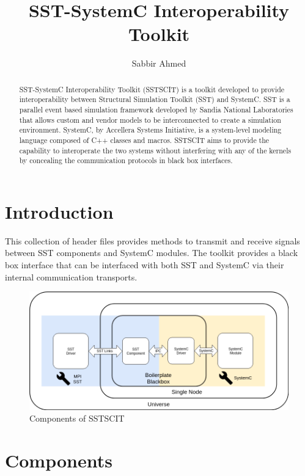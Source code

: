 \documentclass{article}
\title{SST-SystemC Interoperability Toolkit}
\author{
  Sabbir Ahmed
}
\begin{document}
  \maketitle

  \begin{abstract}
    SST-SystemC Interoperability Toolkit (SSTSCIT) is a toolkit developed to provide interoperability between Structural Simulation Toolkit (SST) and SystemC. SST is a parallel event based simulation framework developed by Sandia National Laboratories that allows custom and vendor models to be interconnected to create a simulation environment. SystemC, by Accellera Systems Initiative, is a system-level modeling language composed of C++ classes and macros. SSTSCIT aims to provide the capability to interoperate the two systems without interfering with any of the kernels by concealing the communication protocols in black box interfaces.
  \end{abstract}

  \section{Introduction}
  This collection of header files provides methods to transmit and receive signals between SST components and SystemC modules. The toolkit provides a black box interface that can be interfaced with both SST and SystemC via their internal communication transports. 

  \begin{figure}[!h]
    \centering
    \includegraphics[width=6in]{comm.png}
    \caption{Components of SSTSCIT}
    \label{fig:fig1}
  \end{figure}

  \section{Components} \label{sec:comp}
\end{document}
